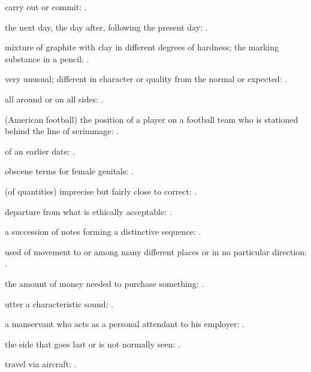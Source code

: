   carry out or commit: .

  the next day, the day after, following the present day: .

  mixture of graphite with clay in different degrees of hardness; the marking substance in a pencil:   .

  very unusual; different in character or quality from the normal or expected: .

  all around or on all sides:   .

  (American football) the position of a player on a football team who is stationed behind the line of scrimmage: .

  of an earlier date: .

  obscene terms for female genitals:   .

  (of quantities) imprecise but fairly close to correct:   .

  departure from what is ethically acceptable:   .

  a succession of notes forming a distinctive sequence:   .

  used of movement to or among many different places or in no particular direction:   .

  the amount of money needed to purchase something: .

  utter a characteristic sound: .

  a manservant who acts as a personal attendant to his employer:   .

  the side that goes last or is not normally seen:   .

  travel via aircraft:   .

